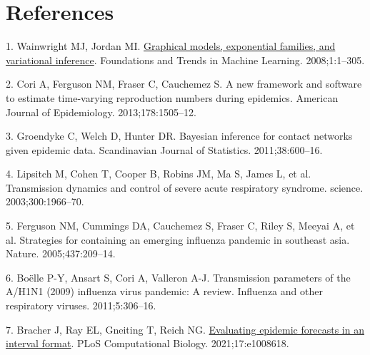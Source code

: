 \documentclass[
]{article}
\newlength{\cslhangindent}
\newlength{\cslentryspacingunit} %
\newenvironment{CSLReferences}[2] %
 {%
  \setlength{\parindent}{0pt}
  \ifodd #1
  \let\oldpar\par
  \def\par{\hangindent=\cslhangindent\oldpar}
  \fi
  \setlength{\parskip}{#2\cslentryspacingunit}
 }%
 {}
\begin{document}
\clearpage

\hypertarget{references}{%
\section*{References}\label{references}}

\hypertarget{refs}{}
\begin{CSLReferences}{0}{0}
\leavevmode{}%
1. Wainwright MJ, Jordan MI. \href{https://doi.org/10.1561/2200000001}{Graphical models, exponential families, and variational inference}. Foundations and Trends in Machine Learning. 2008;1:1--305.

\leavevmode{}%
2. Cori A, Ferguson NM, Fraser C, Cauchemez S. A new framework and software to estimate time-varying reproduction numbers during epidemics. American Journal of Epidemiology. 2013;178:1505--12.

\leavevmode{}%
3. Groendyke C, Welch D, Hunter DR. Bayesian inference for contact networks given epidemic data. Scandinavian Journal of Statistics. 2011;38:600--16.

\leavevmode{}%
4. Lipsitch M, Cohen T, Cooper B, Robins JM, Ma S, James L, et al. Transmission dynamics and control of severe acute respiratory syndrome. science. 2003;300:1966--70.

\leavevmode{}%
5. Ferguson NM, Cummings DA, Cauchemez S, Fraser C, Riley S, Meeyai A, et al. Strategies for containing an emerging influenza pandemic in southeast asia. Nature. 2005;437:209--14.

\leavevmode{}%
6. Boëlle P-Y, Ansart S, Cori A, Valleron A-J. Transmission parameters of the {A/H1N1} (2009) influenza virus pandemic: A review. Influenza and other respiratory viruses. 2011;5:306--16.

\leavevmode{}%
7. Bracher J, Ray EL, Gneiting T, Reich NG. \href{https://doi.org/10.1371/journal.pcbi.1008618}{Evaluating epidemic forecasts in an interval format}. PLoS Computational Biology. 2021;17:e1008618.

\end{CSLReferences}
\end{document}
